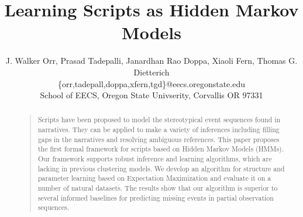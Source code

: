 \documentclass[letterpaper]{article}
\begin{document}
%
\title{Learning Scripts as Hidden Markov Models}
\author{J. Walker Orr, Prasad Tadepalli, Janardhan Rao Doppa, Xiaoli Fern, Thomas G. Dietterich \\ \{orr,tadepall,doppa,xfern,tgd\}@eecs.oregonstate.edu \\School of EECS, Oregon State Univserity, Corvallis OR 97331}
\maketitle
\begin{abstract}
\begin{quote}
Scripts have been proposed to model the stereotypical event sequences found in
narratives. They can be applied to make a variety of inferences including filling
gaps in the narratives and resolving ambiguous references. This paper proposes
the first formal framework for scripts based on Hidden Markov Models (HMMs). Our
framework supports robust inference and learning algorithms, which are lacking in
previous clustering models. We develop an algorithm for structure and parameter
learning based on Expectation Maximization and evaluate it on a number of natural
datasets. The results show that our algorithm is superior to
several informed baselines for predicting missing 
events in partial observation sequences.
%

\end{quote}
\end{abstract}
\end{document}
